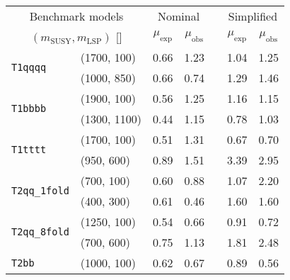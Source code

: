 \begin{table*}[!t]
  \label{tab:susy_aggr_limits}
  \centering
  \begin{tabular}{ llccccc }
    \hline
    \multicolumn{2}{c}{Benchmark models}    & \multicolumn{2}{c}{Nominal}
                                            & 
                                            & \multicolumn{2}{c}{Simplified}             \\ [0.3ex]
    \cline{3-4}
    \cline{6-7}
    \multicolumn{2}{c}{$(m_{\text{SUSY}}, m_{\mathrm{LSP}})$ [\GeVns{}]} 
                                            & $\mu_{\text{exp}}$
                                            & $\mu_{\text{obs}}$
                                            & 
                                            & $\mu_{\text{exp}}$
                                            & $\mu_{\text{obs}}$                         \\ [0.3ex]
    \hline
    \multirow{2}{*}{\texttt{T1qqqq}}        & (1700, 100)   & 0.66 & 1.23 &  & 1.04 & 1.25 \\
                                            & (1000, 850)   & 0.66 & 0.74 &  & 1.29 & 1.46 \\ [0.5ex]
    \multirow{2}{*}{\texttt{T1bbbb}}        & (1900, 100)   & 0.56 & 1.25 &  & 1.16 & 1.15 \\
                                            & (1300, 1100)  & 0.44 & 1.15 &  & 0.78 & 1.03 \\ [0.5ex]
    \multirow{2}{*}{\texttt{T1tttt}}        & (1700, 100)   & 0.51 & 1.31 &  & 0.67 & 0.70 \\
                                            & (950, 600)    & 0.89 & 1.51 &  & 3.39 & 2.95 \\ [0.5ex]
    \multirow{2}{*}{\texttt{T2qq\_1fold}}   & (700, 100)    & 0.60 & 0.88 &  & 1.07 & 2.20 \\
                                            & (400, 300)    & 0.61 & 0.46 &  & 1.60 & 1.60 \\ [0.5ex]
    \multirow{2}{*}{\texttt{T2qq\_8fold}}   & (1250, 100)   & 0.54 & 0.66 &  & 0.91 & 0.72 \\
                                            & (700, 600)    & 0.75 & 1.13 &  & 1.81 & 2.48 \\ [0.5ex]
    \multirow{2}{*}{\texttt{T2bb}}          & (1000, 100)   & 0.62 & 0.67 &  & 0.89 & 0.56 \\

\end{tabular}
\end{table*}
